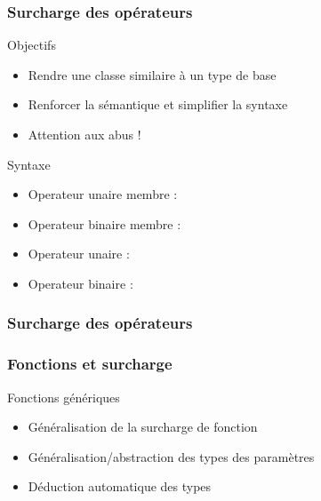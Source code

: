 \documentclass[svgnames]{beamer}
\begin{document}
\frame
{
  \frametitle{Surcharge des opérateurs}
  \begin{block}{Objectifs}
  \begin{itemize}
  \item Rendre une classe similaire à un type de base
  \item Renforcer la sémantique et simplifier la syntaxe
  \item Attention aux abus !
  \end{itemize}
  \end{block}{}

  \begin{block}{Syntaxe}
  \begin{itemize}
  \item Operateur unaire membre : 
  \item Operateur binaire membre : 
  \item Operateur unaire : 
  \item Operateur binaire : 
  \end{itemize}
  \end{block}{}
}

\frame
{
  \frametitle{Surcharge des opérateurs}
}


\frame
{
  \frametitle{Fonctions et surcharge}
  \begin{block}{Fonctions génériques}
  \begin{itemize}
  \item Généralisation de la surcharge de fonction
  \item Généralisation/abstraction des types des paramètres
  \item Déduction automatique des types
  \end{itemize}
  
  \end{block}{}
}
\end{document}
